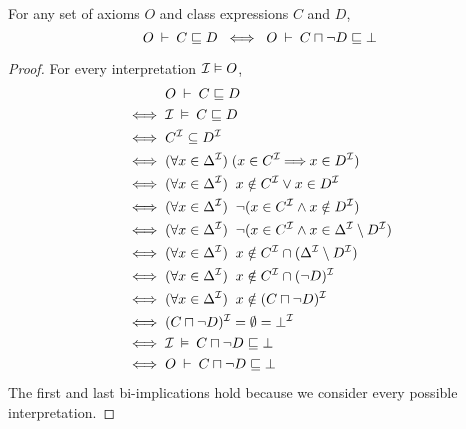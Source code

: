 \documentclass[paper.tex]{subfiles}
\begin{document}
\begin{lemma}
  \label{lem:subclassEntailsUnsat}
  For any set of axioms $O$ and class expressions $C$ and $D$,
  \[ O \:\vdash\: C \sqsubseteq D \;\iff\; O \:\vdash\: C \sqcap \neg D \sqsubseteq \bot \]
\end{lemma}
\begin{proof}
  For every interpretation $\mathcal{I} \vDash O$,
  \begin{align*}
    & O \:\vdash\: C \sqsubseteq D \\
    \iff{}& \mathcal{I} \:\vDash\: C \sqsubseteq D \\
    \iff{}& C^{\mathcal{I}} \subseteq D^{\mathcal{I}} \\
    \iff{}& (\forall x \in \Delta^{\mathcal{I}}) \; (x \in C^{\mathcal{I}} \!\!\implies\!\! x \in D^{\mathcal{I}}) \\
    \iff{}& (\forall x \in \Delta^{\mathcal{I}}) \;\; x \notin C^{\mathcal{I}} \lor x \in D^{\mathcal{I}} \\
    \iff{}& (\forall x \in \Delta^{\mathcal{I}}) \;\; \neg (x \in C^{\mathcal{I}} \land x \notin D^{\mathcal{I}}) \\
    \iff{}& (\forall x \in \Delta^{\mathcal{I}}) \;\; \neg (x \in C^{\mathcal{I}} \land x \in \Delta^{\mathcal{I}} \setminus D^{\mathcal{I}}) \\
    \iff{}& (\forall x \in \Delta^{\mathcal{I}}) \;\; x \notin C^{\mathcal{I}} \cap (\Delta^{\mathcal{I}} \setminus D^{\mathcal{I}}) \\
    \iff{}& (\forall x \in \Delta^{\mathcal{I}}) \;\; x \notin C^{\mathcal{I}} \cap (\neg D)^{\mathcal{I}} \\
    \iff{}& (\forall x \in \Delta^{\mathcal{I}}) \;\; x \notin (C \sqcap \neg D)^{\mathcal{I}} \\
    \iff{}& (C \sqcap \neg D)^{\mathcal{I}} = \emptyset = \bot^{\mathcal{I}} \\
    \iff{}& \mathcal{I} \:\vDash\: C \sqcap \neg D \sqsubseteq \bot \\
    \iff{}& O \:\vdash\: C \sqcap \neg D \sqsubseteq \bot
  \end{align*}
  The first and last bi-implications hold because we consider every possible interpretation.
\end{proof}
\end{document}
